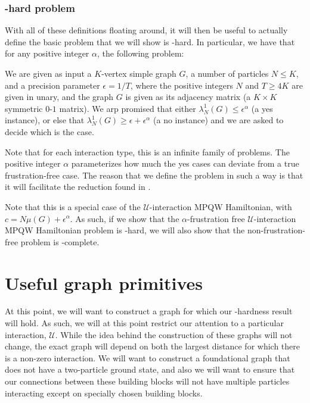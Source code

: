 \documentclass[../thesis-main/thesis-main]{subfiles}
\begin{document}
\subsubsection{\QMA-hard problem}

With all of these definitions floating around, it will then be useful to actually define the basic problem that we will show is \QMA-hard.  In particular, we have that for any positive integer $\alpha$, the following problem:

\begin{problem}
  We are given as input a $K$-vertex simple graph $G$, a number of particles $N\leq K$, and a precision parameter $\epsilon = 1/T$, where the positive integers $N$ and $T \geq 4K$ are given in unary, and the graph $G$ is given as its adjacency matrix (a $K\times K$ symmetric $0$-$1$ matrix). We arp promised that either $\lambda_N^1(G) \leq \epsilon^\alpha$ (a yes instance), or else that $\lambda_N^1(G) \geq \epsilon + \epsilon^\alpha$ (a no instance) and we are asked to decide which is the case.
\end{problem}

Note that for each interaction type, this is an infinite family of problems.  The positive integer $\alpha$ parameterizes how much the yes cases can deviate from a true frustration-free case.  The reason that we define the problem in such a way is that it will facilitate the reduction found in .

Note that this is a special case of the $\mathcal{U}$-interaction MPQW Hamiltonian, with $c = N\mu(G) + \epsilon^\alpha$.  As such, if we show that the $\alpha$-frustration free $\mathcal{U}$-interaction MPQW Hamiltonian problem is \QMA-hard, we will also show that the non-frustration-free problem is \QMA-complete.


\section{Useful graph primitives}\label{sec:graph_primitives}

At this point, we will want to construct a graph for which our \QMA-hardness result will hold.  As such, we will at this point restrict our attention to a particular interaction, $\mathcal{U}$.  While the idea behind the construction of these graphs will not change, the exact graph will depend on both the largest distance for which there is a non-zero interaction.  We will want to construct a foundational graph that does not have a two-particle ground state, and also we will want to ensure that our connections between these building blocks will not have multiple particles interacting except on specially chosen building blocks.
\end{document}

